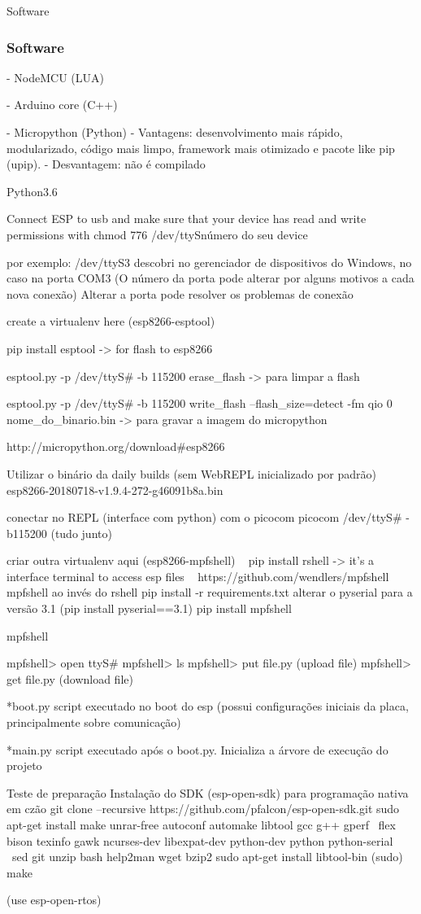 \documentclass[10pt, compress]{beamer}
\begin{document}
\begin{frame}{Software}
  \frametitle{Software}

  - NodeMCU (LUA)

  - Arduino core (C++)

  - Micropython (Python)
    - Vantagens: desenvolvimento mais rápido, modularizado, código mais limpo, framework mais otimizado e pacote like pip (upip).
    - Desvantagem: não é compilado

  Python3.6

  Connect ESP to usb and make sure that your device has read and write permissions with 
  chmod 776 /dev/ttyS{número do seu device}

  por exemplo: /dev/ttyS3
  descobri no gerenciador de dispositivos do Windows, no caso na porta COM3 (O número da porta pode alterar por alguns motivos a cada nova conexão)
  Alterar a porta pode resolver os problemas de conexão 

  create a virtualenv here (esp8266-esptool)

  pip install esptool -> for flash to esp8266 

  esptool.py -p /dev/ttyS# -b 115200 erase\_flash -> para limpar a flash

  esptool.py -p /dev/ttyS# -b 115200 write\_flash --flash\_size=detect -fm qio 0 nome\_do\_binario.bin -> para gravar a imagem do micropython

  http://micropython.org/download#esp8266

  Utilizar o binário da daily builds (sem WebREPL inicializado por padrão)
  esp8266-20180718-v1.9.4-272-g46091b8a.bin 

  conectar no REPL (interface com python) com o picocom
  picocom /dev/ttyS# -b115200 (tudo junto)

  criar outra virtualenv aqui (esp8266-mpfshell)
  ~  pip install rshell -> it's a interface terminal to access esp files ~
  https://github.com/wendlers/mpfshell mpfshell ao invés do rshell
  pip install -r requirements.txt
  alterar o pyserial para a versão 3.1 (pip install pyserial==3.1)
  pip install mpfshell


  mpfshell

  mpfshell> open ttyS#
  mpfshell> ls
  mpfshell> put file.py (upload file)
  mpfshell> get file.py (download file)

  *boot.py script executado no boot do esp (possui configurações iniciais da placa, principalmente sobre comunicação)

  *main.py script executado após o boot.py. Inicializa a árvore de execução do projeto

  Teste de preparação Instalação do SDK (esp-open-sdk) para programação nativa em czão
  git clone --recursive https://github.com/pfalcon/esp-open-sdk.git
  sudo apt-get install make unrar-free autoconf automake libtool gcc g++ gperf \
      flex bison texinfo gawk ncurses-dev libexpat-dev python-dev python python-serial \
          sed git unzip bash help2man wget bzip2
  sudo apt-get install libtool-bin
  (sudo) make 

  (use esp-open-rtos)

\end{frame}
\end{document}
